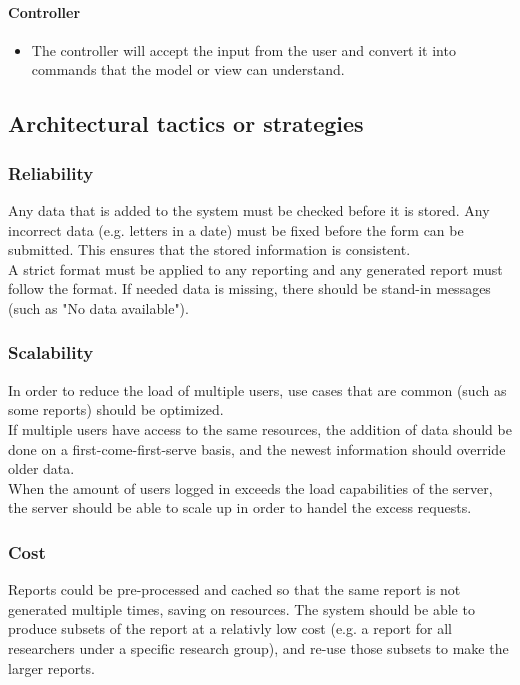 \documentclass{article}
\begin{document}
		\paragraph{Controller} %
		\begin{itemize}
			\item The controller will accept the input from the user and convert it into commands that 		the 					model or view can understand.
			
		\end{itemize} 
		

		\subsection{Architectural tactics or strategies}
			\subsubsection{Reliability}
				Any data that is added to the system must be checked before it is stored. Any incorrect data (e.g. letters in a date) must be fixed before the form can be submitted. This ensures that the stored information is consistent.\\
				
				A strict format must be applied to any reporting and any generated report must follow the format. If needed data is missing, there should be stand-in messages (such as "No data available").
			\subsubsection{Scalability}
				In order to reduce the load of multiple users, use cases that are common (such as some reports) should be optimized.\\
				
				If multiple users have access to the same resources, the addition of data should be done on a first-come-first-serve basis, and the newest information should override older data.\\
				
				When the amount of users logged in exceeds the load capabilities of the server, the server should be able to scale up in order to handel the excess requests.
			\subsubsection{Cost}
				Reports could be pre-processed and cached so that the same report is not generated multiple times, saving on resources. The system should be able to produce subsets of the report at a relativly low cost (e.g. a report for all researchers under a specific research group), and re-use those subsets to make the larger reports.
\end{document}
